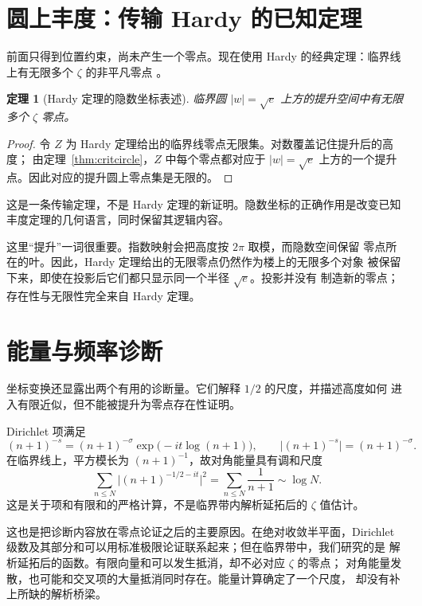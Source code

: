 \documentclass[submission,noinfoline]{jsfds}
\newtheorem{theorem}{定理}
\begin{document}
\section{圆上丰度：传输 Hardy 的已知定理}\label{sec:abundance}

前面只得到位置约束，尚未产生一个零点。现在使用 Hardy 的经典定理：临界线
上有无限多个 $\zeta$ 的非平凡零点 \citep{Hardy1914}。

\begin{theorem}[Hardy 定理的隐数坐标表述]\label{thm:hardy-transport}
临界圆 $|w|=\sqrt e$ 上方的提升空间中有无限多个 $\zeta$ 零点。
\end{theorem}

\begin{proof}
令 $Z$ 为 Hardy 定理给出的临界线零点无限集。对数覆盖记住提升后的高度；
由定理~\ref{thm:critcircle}，$Z$ 中每个零点都对应于 $|w|=\sqrt e$
上方的一个提升点。因此对应的提升圆上零点集是无限的。
\end{proof}

这是一条传输定理，不是 Hardy 定理的新证明。隐数坐标的正确作用是改变已知
丰度定理的几何语言，同时保留其逻辑内容。

这里“提升”一词很重要。指数映射会把高度按 $2\pi$ 取模，而隐数空间保留
零点所在的叶。因此，Hardy 定理给出的无限零点仍然作为楼上的无限多个对象
被保留下来，即使在投影后它们都只显示同一个半径 $\sqrt e$。投影并没有
制造新的零点；存在性与无限性完全来自 Hardy 定理。

\section{能量与频率诊断}\label{sec:diagnostics}

坐标变换还显露出两个有用的诊断量。它们解释 $1/2$ 的尺度，并描述高度如何
进入有限近似，但不能被提升为零点存在性证明。

Dirichlet 项满足
\[
  (n+1)^{-s}=(n+1)^{-\sigma}
  \exp\bigl(-it\log(n+1)\bigr),
  \qquad
  \bigl|(n+1)^{-s}\bigr|=(n+1)^{-\sigma}.
\]
在临界线上，平方模长为 $(n+1)^{-1}$，故对角能量具有调和尺度
\[
  \sum_{n\leq N}\bigl|(n+1)^{-1/2-it}\bigr|^2
  =\sum_{n\leq N}\frac1{n+1}\sim\log N.
\]
这是关于项和有限和的严格计算，不是临界带内解析延拓后的 $\zeta$ 值估计。

这也是把诊断内容放在零点论证之后的主要原因。在绝对收敛半平面，Dirichlet
级数及其部分和可以用标准极限论证联系起来；但在临界带中，我们研究的是
解析延拓后的函数。有限向量和可以发生抵消，却不必对应 $\zeta$ 的零点；
对角能量发散，也可能和交叉项的大量抵消同时存在。能量计算确定了一个尺度，
却没有补上所缺的解析桥梁。
\end{document}
